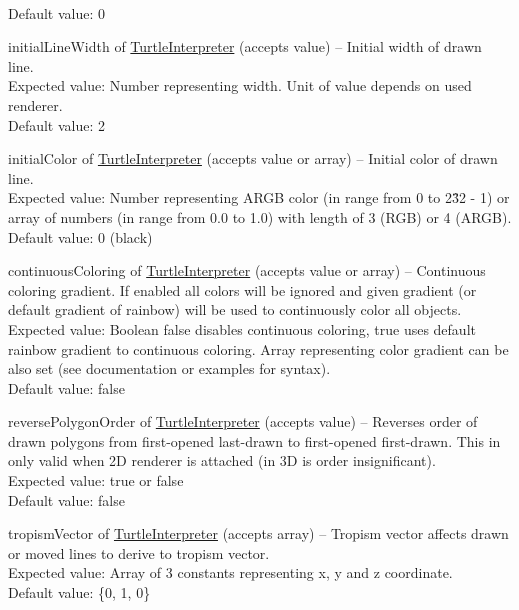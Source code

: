 \begin{description*}
			\\ Default value: 0
		\item[initialLineWidth] of \hyperref[Malsys.Processing.Components.Interpreters.TurtleInterpreter]{TurtleInterpreter}
		(accepts value)
			-- Initial width of drawn line.
			\\ Expected value: Number representing width. Unit of value depends on used renderer.
			\\ Default value: 2
		\item[initialColor] of \hyperref[Malsys.Processing.Components.Interpreters.TurtleInterpreter]{TurtleInterpreter}
		(accepts value or array)
			-- Initial color of drawn line.
			\\ Expected value: Number representing ARGB color (in range from 0 to 2\^32 - 1) or array of numbers (in range from 0.0 to 1.0) with length of 3 (RGB) or 4 (ARGB).
			\\ Default value: 0 (black)
		\item[continuousColoring] of \hyperref[Malsys.Processing.Components.Interpreters.TurtleInterpreter]{TurtleInterpreter}
		(accepts value or array)
			-- Continuous coloring gradient.
            If enabled all colors will be ignored and given gradient (or default gradient of rainbow) will be used to continuously color all objects.
			\\ Expected value: Boolean false disables continuous coloring, true uses default rainbow gradient to continuous coloring.
            	Array representing color gradient can be also set (see documentation or examples for syntax).
			\\ Default value: false
		\item[reversePolygonOrder] of \hyperref[Malsys.Processing.Components.Interpreters.TurtleInterpreter]{TurtleInterpreter}
		(accepts value)
			-- Reverses order of drawn polygons from first-opened last-drawn to first-opened first-drawn.
            This in only valid when 2D renderer is attached (in 3D is order insignificant).
			\\ Expected value: true or false
			\\ Default value: false
		\item[tropismVector] of \hyperref[Malsys.Processing.Components.Interpreters.TurtleInterpreter]{TurtleInterpreter}
		(accepts array)
			-- Tropism vector affects drawn or moved lines to derive to tropism vector.
			\\ Expected value: Array of 3 constants representing x, y and z coordinate.
			\\ Default value: \{0, 1, 0\}

\end{description*}
